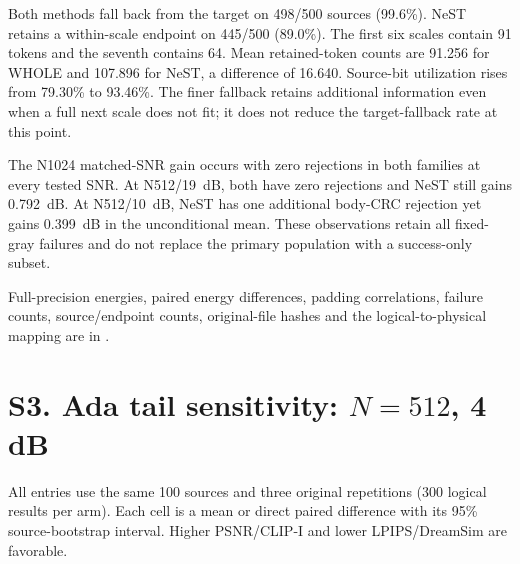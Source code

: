 \documentclass[11pt,letterpaper]{article}
\begin{document}
Both methods fall back from the target on 498/500 sources (99.6\%). NeST retains a within-scale endpoint on 445/500 (89.0\%). The first six scales contain 91 tokens and the seventh contains 64. Mean retained-token counts are 91.256 for WHOLE and 107.896 for NeST, a difference of 16.640. Source-bit utilization rises from 79.30\% to 93.46\%. The finer fallback retains additional information even when a full next scale does not fit; it does not reduce the target-fallback rate at this point.

The N1024 matched-SNR gain occurs with zero rejections in both families at every tested SNR. At N512/19~dB, both have zero rejections and NeST still gains 0.792~dB. At N512/10~dB, NeST has one additional body-CRC rejection yet gains 0.399~dB in the unconditional mean. These observations retain all fixed-gray failures and do not replace the primary population with a success-only subset.

Full-precision energies, paired energy differences, padding correlations, failure counts, source/endpoint counts, original-file hashes and the logical-to-physical mapping are in
.



\clearpage\section*{S3. Ada tail sensitivity: $N=512$, 4 dB}
All entries use the same 100 sources and three original repetitions (300 logical results per arm). Each cell is a mean or direct paired difference with its 95\% source-bootstrap interval. Higher PSNR/CLIP-I and lower LPIPS/DreamSim are favorable.
\end{document}
